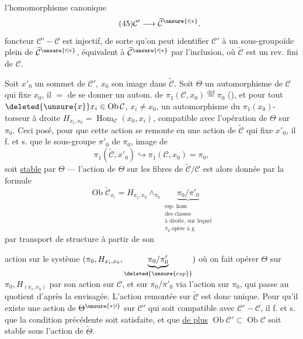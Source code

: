 l'homomorphisme canonique
\[
\tag{45}\mathcal C'\longrightarrow\widetilde{\mathcal C}^{\unsure{\prime|*}}.
\]
 foncteur $\mathcal C'-\mathcal C$ est injectif, de sorte qu'on peut identifier $\mathcal C'$ à un sous-groupoïde plein de $\widetilde{\mathcal C}^{\unsure{\prime|*}}$, équivalent à $\widetilde{\mathcal C}^{\unsure{\prime|*}}$ par l'inclusion, où $\widetilde{\mathcal C}$ est un rev. fini de $\mathcal C$.

Soit $x'_0$ un sommet de $\mathcal C'$, $x_0$ son image dans $\widetilde{\mathcal C}$. Soit $\Theta$ un automorphisme de $\mathcal C$ qui fixe $x_0$, il   $=$ de se donner un autom. de  $\pi_1(\mathcal C,x_0)\overset{\mathrm{def}}{=}\pi_0$ (), et pour tout  $\deleted{\unsure{x}}x_i\in\operatorname{Ob}\mathcal C$, $x_i\ne x_0$, un automorphisme du $\pi_1(x_0)$-torseur à droite $H_{x_i,x_0}=\operatorname{Hom}_{\mathcal C}(x_0,x_i)$, compatible avec l'opération de $\Theta$ sur $\pi_0$. Ceci posé, pour que cette action se remonte en une action de $\widetilde{\mathcal C}$ qui fixe $x'_0$, il f. et s. que le sous-groupe $\pi'_0$ de $\pi_0$, image de 
\[
\pi_1(\widetilde{\mathcal C},x'_0)\hookrightarrow\pi_1(\mathcal C,x_0)=\pi_0,
\]
soit \uline{stable} par $\Theta$ --- l'action de $\Theta$ sur les fibres  de $\widetilde{\mathcal C}/\mathcal C$ est alors donnée par la formule
\[
\tag{45}\operatorname{Ob}\widetilde{\mathcal C}_{x_i}=H_{x_i,x_0}\wedge_{\pi_0}\underbrace{\pi_0/\pi'_0}_{\substack{\text{esp. hom}\\\text{des classes}\\\text{à droite, sur lequel}\\\pi_0\ \text{opère à g}}}
\]
par transport de structure à partir de son

action sur  le système $(\pi_0,H_{x_i,x_0},\underbrace{\pi_0/\pi'_0}_{\deleted{\unsure{esp}}})$ où on fait opérer $\Theta$ sur $\pi_0,H_{(x_i,x_0)}$ par son action sur $\mathcal C$, et sur $\pi_0/\pi'_0$ via l'action sur $\pi_0$, qui passe au quotient d'après la    envisagée. L'action  remontée   sur $\widetilde{\mathcal C}$ est donc unique. Pour qu'il existe une action de $\Theta^{\unsure{*|\prime}}$ sur $\mathcal C'$ qui soit compatible avec $\mathcal C'-\mathcal C$, il f. et s. que la condition précédente soit satisfaite, et que \uline{de plus} $\operatorname{Ob}\mathcal C'\subset\operatorname{Ob}\mathcal C$ soit stable sous  l'action de $\widetilde\Theta$.

